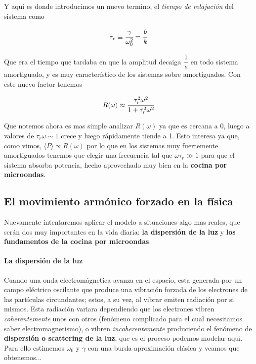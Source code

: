 \documentclass[a4paper,spanish]{article}
\numberwithin{equation}{section}
\begin{document}
Y aqu\'i es donde introducimos un nuevo termino, el \textit{tiempo de relajaci\'on} del sistema como

\begin{equation}
\tau_r\equiv\cfrac{\gamma}{\omega_0 ^2}=\cfrac{b}{k}
\label{tiempo_de_relajacion}
\end{equation}

Que era el tiempo que tardaba en que la amplitud decaiga $\cfrac{1}{e}$ en todo sistema amortiguado, y es muy caracter\'istico de los sistemas sobre amortiguados. Con este nuevo factor tenemos

\begin{equation}
R(\omega)\approx \cfrac{\tau_r ^2\omega^2}{1+\tau_r ^2\omega^2}
\end{equation}

Que notemos ahora es mas simple analizar $R(\omega)$ ya que es cercana a 0, luego a valores de $\tau_r\omega\sim1$ crece y luego r\'apidamente tiende a 1. Esto interesa ya que, como vimos, $\langle{P}\rangle \propto R(\omega)$ por lo que en los sistemas muy fuertemente amortiguados tenemos que elegir una frecuencia tal que $\omega\tau_r \gg 1$ para que el sistema absorba potencia, hecho aprovechado muy bien en la \textbf{cocina por microondas}.

\subsection{El movimiento arm\'onico forzado en la f\'isica}
Nuevamente intentaremos aplicar el modelo a situaciones algo mas reales, que ser\'an dos muy importantes en la vida diaria: \textbf{la dispersi\'on de la luz} y \textbf{los fundamentos de la cocina por microondas}.

\paragraph{La dispersi\'on de la luz}
Cuando una onda electrom\'agnetica avanza en el espacio, esta generada por un campo el\'ectrico oscilante que produce una vibraci\'on forzada de los electrones de las part\'iculas circundantes; estos, a su vez, al vibrar emiten radiaci\'on por si mismos. Esta radiaci\'on variara dependiendo que los electrones vibren \textit{coherentemente} unos con otros (fen\'omeno complicado para el cual necesitamos saber electromagnetismo), o vibren \textit{incoherentemente} produciendo el fen\'omeno de \textbf{dispersi\'on o scattering de la luz}, que es el proceso podemos modelar aqu\'i. Para ello estimemos $\omega_0$ y $\gamma$ con una burda aproximaci\'on cl\'asica y veamos que obtenemos...
\end{document}
